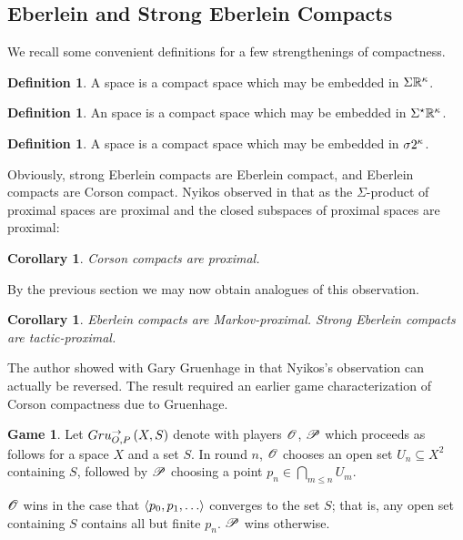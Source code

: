 \documentclass{amsart}
\newtheorem{corollary}[theorem]{Corollary}
\theoremstyle{definition}
\newtheorem{definition}[theorem]{Definition}
\newtheorem{game}[theorem]{Game}
\begin{document}
\subsection{Eberlein and Strong Eberlein Compacts}

  We recall some convenient definitions for a few strengthenings of
  compactness.

  \begin{definition}
    A  space is a compact space which may be embedded in
    \(\Sigma\mathbb{R}^{\kappa}\).
  \end{definition}

  \begin{definition}
    An  space is a compact space which may be embedded
    in \(\Sigma^\star\mathbb{R}^{\kappa}\).
  \end{definition}

  \begin{definition}
    A  space is a compact space which may
    be embedded in \(\sigma2^{\kappa}\).
  \end{definition}

  Obviously, strong Eberlein compacts are Eberlein compact, and Eberlein
  compacts are Corson compact. Nyikos observed in
  \cite{MR3288115} that as the \(\Sigma\)-product of proximal spaces
  are proximal and the closed subspaces of proximal spaces are proximal:

  \begin{corollary}
    Corson compacts are proximal.
  \end{corollary}

  By the previous section we may now obtain analogues of this observation.

  \begin{corollary}
    Eberlein compacts are Markov-proximal. Strong Eberlein compacts are
    tactic-proximal.
  \end{corollary}

  The author showed with Gary Gruenhage in \cite{MR3227201} that
  Nyikos's observation can actually be reversed. The result required an
  earlier game characterization of Corson compactness due to Gruenhage.

  \begin{game}
    Let \(Gru_{O,P}^{\to}\left({X},{S}\right)\) denote
     with
    players \(\mathscr{O}\), \(\mathscr{P}\) which proceeds as follows for a space
    \(X\) and a set \(S\). In round \(n\),
    \(\mathscr{O}\) chooses an open set \(U_n\subseteq X^2\) containing
    \(S\), followed by \(\mathscr{P}\)
    choosing a point \(p_n\in \bigcap_{m\leq n}U_m\).

    \(\mathscr{O}\) wins in the case that
    \(\<p_0,p_1,\dots\>\) converges to the set \(S\); that is,
    any open set containing \(S\) contains all but finite \(p_n\).
    \(\mathscr{P}\) wins otherwise.
  \end{game}
\end{document}
